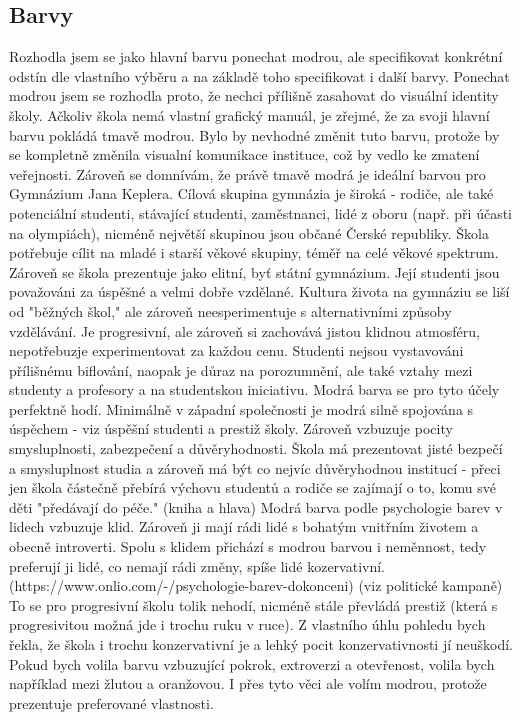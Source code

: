 \documentclass[11pt,a4paper,twoside,openright]{report}
\begin{document}
\subsection{Barvy}
Rozhodla jsem se jako hlavní barvu ponechat modrou, ale specifikovat konkrétní odstín dle vlastního výběru a na základě toho specifikovat i další barvy. Ponechat modrou jsem se rozhodla proto, že nechci přílišně zasahovat do visuální identity školy. Ačkoliv škola nemá vlastní grafický manuál, je zřejmé, že za svoji hlavní barvu pokládá tmavě modrou. Bylo by nevhodné změnit tuto barvu, protože by se kompletně změnila visualní komunikace instituce, což by vedlo ke zmatení veřejnosti.
Zároveň se domnívám, že právě tmavě modrá je ideální barvou pro Gymnázium Jana Keplera. Cílová skupina gymnázia je široká - rodiče, ale také potenciální studenti, stávající studenti, zaměstnanci, lidé z oboru (např. při účasti na olympiách), nicméně největší skupinou jsou občané Čerské republiky. Škola potřebuje cílit na mladé i starší věkové skupiny, téměř na celé věkové spektrum. Zároveň se škola prezentuje jako elitní, byť státní gymnázium. Její studenti jsou považováni za úspěšné a velmi dobře vzdělané. Kultura života na gymnáziu se liší od "běžných škol," ale zároveň neesperimentuje s alternativními způsoby vzdělávání. Je progresivní, ale zároveň si zachovává jistou klidnou atmosféru, nepotřebuzje experimentovat za každou cenu. Studenti nejsou vystavováni přílišnému biflování, naopak je důraz na porozumnění, ale také vztahy mezi studenty a profesory a na studentskou iniciativu. Modrá barva se pro tyto účely perfektně hodí. Minimálně v západní společnosti je modrá silně spojována s úspěchem - viz úspěšní studenti a prestiž školy. Zároveň vzbuzuje pocity smysluplnosti, zabezpečení a důvěryhodnosti. Škola má prezentovat jisté bezpečí a smysluplnost studia a zároveň má být co nejvíc důvěryhodnou institucí - přeci jen škola částečně přebírá výchovu studentů a rodiče se zajímají o to, komu své děti "předávají do péče." (kniha a hlava)
Modrá barva podle psychologie barev v lidech vzbuzuje klid. Zároveň ji mají rádi lidé s bohatým vnitřním životem a obecně introverti. Spolu s klidem přichází s modrou barvou i neměnnost, tedy preferují ji lidé, co nemají rádi změny, spíše lidé kozervativní. (https://www.onlio.com/-/psychologie-barev-dokonceni) (viz politické kampaně) To se pro progresivní školu tolik nehodí, nicméně stále převládá prestiž (která s progresivitou možná jde i trochu ruku v ruce). Z vlastního úhlu pohledu bych řekla, že škola i trochu konzervativní je a lehký pocit konzervativnosti jí neuškodí. Pokud bych volila barvu vzbuzující pokrok, extroverzi a otevřenost, volila bych například mezi žlutou a oranžovou. I přes tyto věci ale volím modrou, protože prezentuje preferované vlastnosti.
\end{document}

